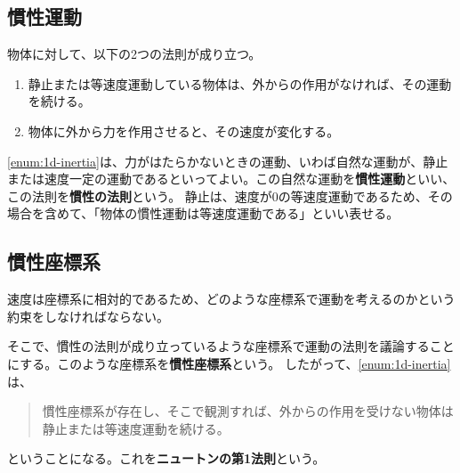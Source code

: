 \documentclass[a4paper, uplatex]{jsarticle}
\begin{document}
\subsection{慣性運動}
物体に対して、以下の2つの法則が成り立つ。

\begin{enumerate}
  \item 静止または等速度運動している物体は、外からの作用がなければ、その運動を続ける。 \label{enum:1d-inertia}
  \item 物体に外から力を作用させると、その速度が変化する。 \label{enum:1d-force}
\end{enumerate}

\ref{enum:1d-inertia}は、力がはたらかないときの運動、いわば自然な運動が、静止または速度一定の運動であるといってよい。この自然な運動を\textbf{慣性運動}といい、この法則を\textbf{慣性の法則}という。
静止は、速度が0の等速度運動であるため、その場合を含めて、「物体の慣性運動は等速度運動である」といい表せる。

\subsection{慣性座標系}
速度は座標系に相対的であるため、どのような座標系で運動を考えるのかという約束をしなければならない。

そこで、慣性の法則が成り立っているような座標系で運動の法則を議論することにする。このような座標系を\textbf{慣性座標系}という。
したがって、\ref{enum:1d-inertia}は、
\begin{quote}
  慣性座標系が存在し、そこで観測すれば、外からの作用を受けない物体は静止または等速度運動を続ける。
\end{quote}
ということになる。これを\textbf{ニュートンの第1法則}という。
\end{document}
